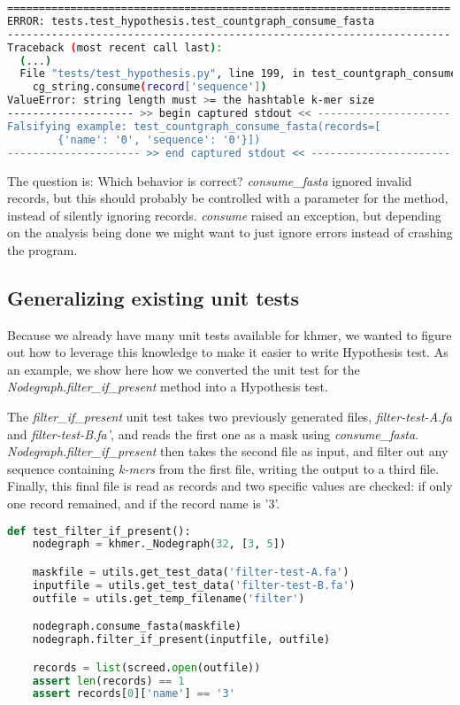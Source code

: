 \documentclass[preprint,nocopyrightspace]{sig-alternate}
\begin{document}
\begin{lstlisting}[language=Bash,basicstyle=\tiny\tt,caption={Inconsistent behavior between consume\_fasta and consume},label={CountgraphConsumeOutput}]
======================================================================
ERROR: tests.test_hypothesis.test_countgraph_consume_fasta
----------------------------------------------------------------------
Traceback (most recent call last):
  (...)
  File "tests/test_hypothesis.py", line 199, in test_countgraph_consume_fasta
    cg_string.consume(record['sequence'])
ValueError: string length must >= the hashtable k-mer size
-------------------- >> begin captured stdout << ---------------------
Falsifying example: test_countgraph_consume_fasta(records=[
		{'name': '0', 'sequence': '0'}])
--------------------- >> end captured stdout << ----------------------
\end{lstlisting}

The question is: Which behavior is correct? \emph{consume\_fasta} ignored invalid records,
but this should probably be controlled with a parameter for the method,
instead of silently ignoring records.
\emph{consume} raised an exception,
but depending on the analysis being done we might want to just ignore errors instead of crashing the program.

\subsection{Generalizing existing unit tests}

Because we already have many unit tests available for khmer,
we wanted to figure out how to leverage this knowledge to make it easier to write Hypothesis test.
As an example,
we show here how we converted the unit test for the \emph{Nodegraph.filter\_if\_present} method into a Hypothesis test.

The \emph{filter\_if\_present} unit test takes two previously generated files,
\emph{filter-test-A.fa} and \emph{filter-test-B.fa'},
and reads the first one as a mask using \emph{consume\_fasta}.
\emph{Nodegraph.filter\_if\_present} then takes the second file as input,
and filter out any sequence containing \emph{k-mers} from the first file,
writing the output to a third file.
Finally,
this final file is read as records and two specific values are checked:
if only one record remained,
and if the record name is '3'.

\begin{lstlisting}[language=Python,basicstyle=\tiny\tt,caption={filter\_if\_present unit test},label={FilterUnit}]
def test_filter_if_present():
    nodegraph = khmer._Nodegraph(32, [3, 5])

    maskfile = utils.get_test_data('filter-test-A.fa')
    inputfile = utils.get_test_data('filter-test-B.fa')
    outfile = utils.get_temp_filename('filter')

    nodegraph.consume_fasta(maskfile)
    nodegraph.filter_if_present(inputfile, outfile)

    records = list(screed.open(outfile))
    assert len(records) == 1
    assert records[0]['name'] == '3'

\end{lstlisting}
\end{document}
